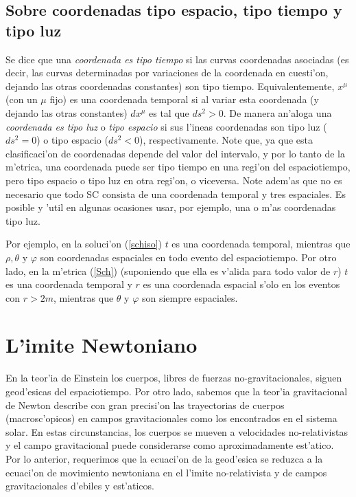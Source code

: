 \subsection{Sobre coordenadas tipo espacio, tipo tiempo y tipo luz}

Se dice que una \textit{coordenada es tipo tiempo} si las curvas coordenadas asociadas (es decir, las curvas determinadas por variaciones de la coordenada en cuesti'on, dejando las otras coordenadas constantes) son tipo tiempo. Equivalentemente, $x^\mu$ (con un $\mu$ fijo) es una coordenada temporal si al variar esta coordenada (y dejando las otras constantes) $dx^\mu$ es tal que $ds^2>0$. De manera an'aloga una \textit{coordenada es tipo luz} o \textit{tipo espacio} si sus l'ineas coordenadas son tipo luz ($ds^2=0$) o tipo espacio ($ds^2<0$), respectivamente. Note que, ya que esta clasificaci'on de coordenadas depende del valor del intervalo, y por lo tanto de la m'etrica, una coordenada puede ser tipo tiempo en una regi'on del espaciotiempo, pero tipo espacio o tipo luz en otra regi'on, o viceversa. Note adem'as que no es necesario que todo SC consista de una coordenada temporal y tres espaciales. Es posible y 'util en algunas ocasiones usar, por ejemplo, una o m'as coordenadas tipo luz.

Por ejemplo, en la soluci'on (\ref{schiso}) $t$ es una coordenada temporal, mientras que $\rho, \theta$ y $\varphi$ son coordenadas espaciales en todo evento del espaciotiempo. Por otro lado, en la m'etrica (\ref{Sch})  (suponiendo que ella es v'alida para todo valor de $r$) $t$ es una coordenada temporal y $r$ es una coordenada espacial s'olo en los eventos con $r>2m$, mientras que $\theta$ y $\varphi$ son siempre espaciales.


\section{L'imite Newtoniano}

En la teor'ia de Einstein los cuerpos, libres de fuerzas no-gravitacionales, siguen geod'esicas del espaciotiempo.
Por otro lado, sabemos que la teor'ia gravitacional de Newton describe con
gran precisi'on las trayectorias de cuerpos (macrosc'opicos) en campos
gravitacionales como los encontrados en el sistema solar. En estas
circunstancias, los cuerpos se mueven a velocidades no-relativistas y el campo gravitacional puede considerarse como aproximadamente est'atico. Por lo
anterior, requerimos que la ecuaci'on de la geod'esica se reduzca a la
ecuaci'on de movimiento newtoniana en el l'imite no-relativista y de campos
gravitacionales d'ebiles y est'aticos.

